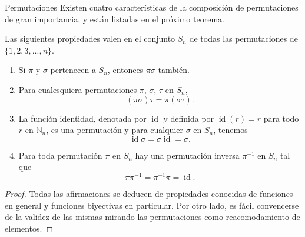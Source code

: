\begin{section}{Permutaciones}
Existen cuatro características de la composición de permutaciones de gran importancia, y están listadas en el próximo teorema.

\begin{teorema}\label{tA3} Las siguientes propiedades valen en el conjunto $S_n$ de todas las permutaciones de $\{1,2,3,...,n\}$.
\begin{enumerate}[label=(\alph*)]
\item  Si $\pi$ y $\sigma$ pertenecen a $S_n$, entonces $\pi\sigma$ también.
\item  Para cualesquiera permutaciones $\pi$, $\sigma$, $\tau$ en $S_n$,
$$
(\pi\sigma)\tau=\pi(\sigma\tau).$$
\item  La función identidad, denotada por $\operatorname{id}$ y definida por $\operatorname{id}(r) =r$ para todo $r$ en $\mathbb N_n$, es una permutación y para cualquier $\sigma$ en $S_n$,
tenemos
$$
\operatorname{id}\sigma=\sigma\operatorname{id}=\sigma.$$
\item  Para toda permutación $\pi$ en $S_n$ hay una permutación inversa $\pi^{-1}$ en $S_n$ tal que
$$
\pi\pi^{-1} = \pi^{-1}\pi = \operatorname{id}.
$$
\end{enumerate}
\end{teorema}
\begin{proof} Todas las afirmaciones se deducen de propiedades conocidas de funciones en general y funciones biyectivas en particular. Por otro lado, es fácil convencerse de la validez de las mismas mirando las permutaciones como reacomodamiento de elementos. 
\end{proof}



\end{section}
